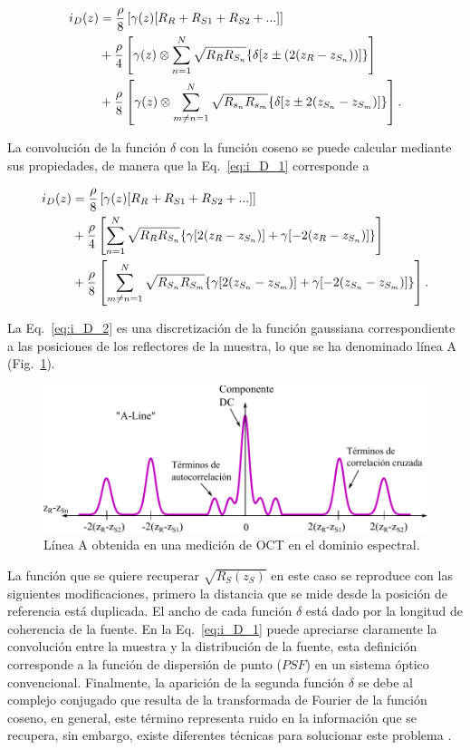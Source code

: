 \begin{align}
\label{eq:i_D_1}
i_D(z) &= \frac{\rho}{8}\left[\gamma (z) [R_R + R_{S1} + R_{S2} + ...] \right]\\ \notag
&+ \frac{\rho}{4} \left[\gamma (z) \otimes \sum_{n=1}^{N} \sqrt{R_R R_{S_n}}\{\delta[z\pm (2(z_R-z_{S_n}))]\}\right]\\
&+ \frac{\rho}{8} \left[\gamma (z) \otimes \sum_{m\neq n = 1}^{N} \sqrt{R_{s_n}R_{s_m}} \{\delta [z\pm 2(z_{S_n} - z_{S_m})]\} \right].\notag
\end{align}

\noindent La convolución de la función $\delta$ con la función coseno se puede calcular mediante sus propiedades, de manera que la Eq.~\ref{eq:i_D_1} corresponde a

\begin{align}
\label{eq:i_D_2}
i_D(z) &= \frac{\rho}{8}\left[\gamma (z) [R_R + R_{S1} + R_{S2} + ...] \right]\\ \notag
&+ \frac{\rho}{4} \left[\sum_{n=1}^{N} \sqrt{R_R R_{S_n}}\{\gamma [2(z_R - z_{S_n}) ] + \gamma[-2(z_R - z_{S_n}) ]\}  \right]\\
&+ \frac{\rho}{8} \left[ \sum_{m\neq n = 1}^{N} \sqrt{R_{S_n}R_{S_m}} \{\gamma [2(z_{S_n} - z_{S_m}) ] + \gamma[-2(z_{S_n} - z_{S_m}) ]\}  \right].\notag
\end{align}

\noindent La Eq.~\ref{eq:i_D_2} es una discretización de la función gaussiana correspondiente a las posiciones de los reflectores de la muestra, lo que se ha denominado línea A (Fig.~\ref{fig:fdoct}).
\begin{figure}[ht!]
	\centering
	\includegraphics[width=\linewidth]{img/A_Line_FFT}
	\caption{Línea A obtenida en una medición de OCT en el dominio espectral.}
	\label{fig:fdoct}
\end{figure}

La función que se quiere recuperar $\sqrt{R_S(z_S)}$ en este caso se reproduce con las siguientes modificaciones, primero la distancia que se mide desde la posición de referencia está duplicada. El ancho de cada función $\delta$ está dado por la longitud de coherencia de la fuente. En la Eq.~\ref{eq:i_D_1} puede apreciarse claramente la convolución entre la muestra y la distribución de la fuente, esta definición corresponde a la función de dispersión de punto ($PSF$) en un sistema óptico convencional. Finalmente, la aparición de la segunda función $\delta$ se debe al complejo conjugado que resulta de la transformada de Fourier de la función coseno, en general, este término representa ruido en la información que se recupera, sin embargo, existe diferentes técnicas para solucionar este problema \cite{Ho2006,Vergnole2008}.


